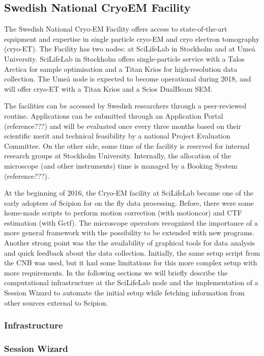 
\subsection{Swedish National CryoEM Facility}

The Swedish National Cryo-EM Facility offers access to state-of-the-art equipment and expertise 
in single particle cryo-EM and cryo electron tomography (cryo-ET). The Facility has two nodes: at SciLifeLab 
in Stockholm and at Umeå University. SciLifeLab in Stockholm offers single-particle service with a 
Talos Arctica for sample optimisation and a Titan Krios for high-resolution data collection. 
The Umeå node is expected to become operational during 2018, and will offer cryo-ET with a 
Titan Krios and a Scios DualBeam SEM.

The facilities can be accessed by Swedish researchers through a peer-reviewed routine. Applications can be 
submitted through an Application Portal (reference???) and will be evaluated once every three months based on their 
scientific merit and technical feasibility by a national Project Evaluation Committee. On the other side, 
some time of the facility is reserved for internal research groups at Stockholm University. Internally, the allocation
of the microscope (and other instruments) time is managed by a Booking System (reference???). 


At the beginning of 2016, the Cryo-EM facility at SciLifeLab became one of the early adopters of Scipion 
for on the fly data processing. Before, there were some home-made scripts to perform motion correction (with motioncor)
and CTF estimation (with Gctf). The microscope operators recognized the importance of  
a more general framework with the possibility to be extended with new programs. Another strong point was the 
the availability of graphical tools for data analysis and quick feedback about the data collection. Initially, the 
same setup script from the CNB was used, but it had some limitations for this more complex setup with more 
requirements. In the following sections we will briefly describe the computational infrastructure at the
SciLifeLab node and the implementation of a Session Wizard to automate the initial setup while fetching 
information from other sources external to Scipion. 


\subsubsection{Infrastructure}


\subsubsection{Session Wizard}

